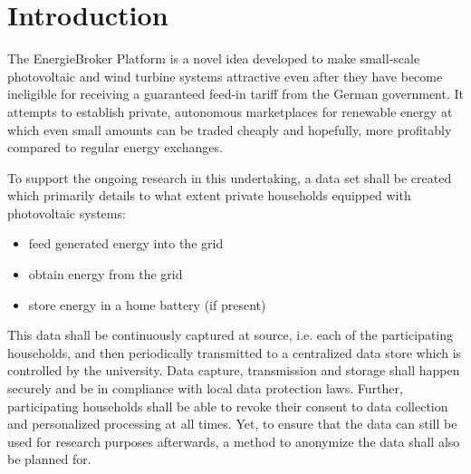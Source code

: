 \documentclass[11pt,a4paper]{article}
\begin{document}

\section{Introduction}


The EnergieBroker Platform is a novel idea developed to make small-scale photovoltaic and wind turbine systems attractive even after they have become ineligible for receiving a guaranteed feed-in tariff from the German government. It attempts to establish private, autonomous marketplaces for renewable energy at which even small amounts can be traded cheaply and hopefully, more profitably compared to regular energy exchanges.

To support the ongoing research in this undertaking, a data set shall be created which primarily details to what extent private households equipped with photovoltaic systems:

\begin{itemize}
  \item feed generated energy into the grid 
  \item obtain energy from the grid
  \item store energy in a home battery (if present)
\end{itemize}

This data shall be continuously captured at source, i.e. each of the participating households, and then periodically transmitted to a centralized data store which is controlled by the university. Data capture, transmission and storage shall happen securely and be in compliance with local data protection laws. Further, participating households shall be able to revoke their consent to data collection and personalized processing at all times. Yet, to ensure that the data can still be used for research purposes afterwards, a method to anonymize the data shall also be planned for.
\end{document}
